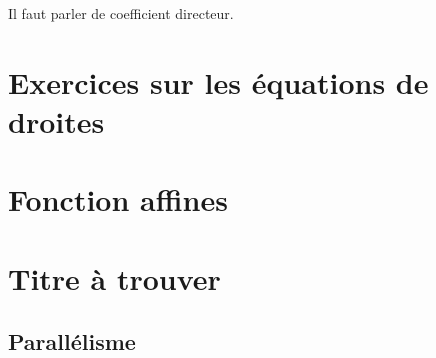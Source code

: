 

Il faut parler de coefficient directeur.


\section{Exercices sur les équations de droites}

\section{Fonction affines}


\section{Titre à trouver}



\subsection{Parallélisme}


